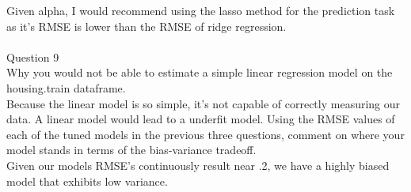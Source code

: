 \documentclass{article}
\begin{document}
Given alpha, I would recommend using the lasso method for the prediction task as it's RMSE is lower than the RMSE of ridge regression. \\
\\
Question 9\\
Why you would not be able to estimate a simple linear regression model on the
housing.train dataframe.\\
Because the linear model is so simple, it's not capable of correctly measuring our data. A linear model would lead to a underfit model.
Using the RMSE values of each of the tuned models in the previous three questions, comment on where your model stands in terms of the bias-variance tradeoff.\\
Given our models RMSE's continuously result near .2, we have a highly biased model that exhibits low variance.
\end{document}
